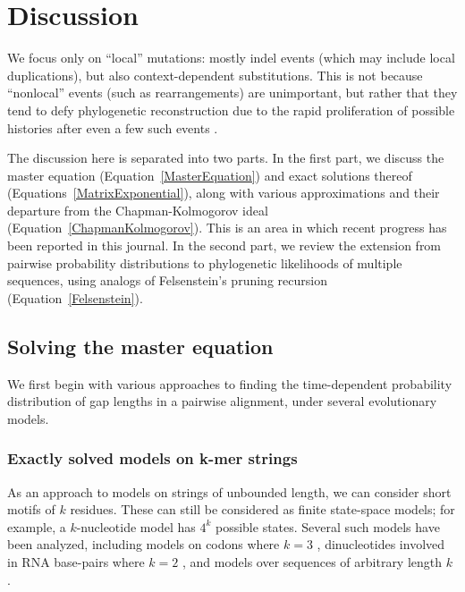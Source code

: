 \documentclass{bmcart}
\newcommand{\eqref}[1]{Equation~\ref{#1}}
\begin{document}
\section*{Discussion}

We focus only on ``local'' mutations: mostly indel events (which may include local duplications),
but also context-dependent substitutions.
This is not because ``nonlocal'' events (such as rearrangements) are unimportant,
but rather that they tend to defy phylogenetic reconstruction due to the rapid proliferation of possible histories
after even a few such events \cite{pmid9773350}.

The discussion here is separated into two parts.
In the first part, we discuss
the master equation (\eqref{MasterEquation})
and exact solutions thereof (Equations~\ref{MatrixExponential}),
along with various approximations and their departure from the Chapman-Kolmogorov ideal (\eqref{ChapmanKolmogorov}).
This is an area in which recent progress has been reported in this journal.
In the second part, we review
the extension from pairwise probability distributions
to phylogenetic likelihoods of multiple sequences,
using analogs of Felsenstein's pruning recursion (\eqref{Felsenstein}).

\subsection*{Solving the master equation}

We first begin with various approaches to finding the time-dependent probability distribution
of gap lengths in a pairwise alignment,
under several evolutionary models.

\color{red}
\subsubsection*{Exactly solved models on k-mer strings}

As an approach to models on strings of unbounded length, we can consider short motifs of $k$ residues.
These can still be considered as finite state-space models;
for example, a $k$-nucleotide model has $4^k$ possible states.
Several such models have been analyzed, including models on codons where $k=3$
\cite{pmid8281128,pmid7968486},
dinucleotides involved in RNA base-pairs where $k=2$ \cite{pmid7475089,KnudsenHein99,pmid17884102},
and models over sequences of arbitrary length $k$ \cite{LunterHein04,pmid26135206}.
\end{document}

